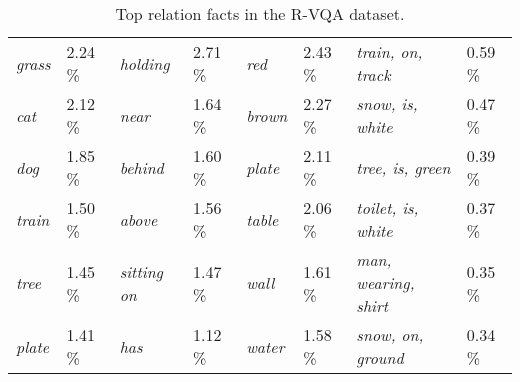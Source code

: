 \documentclass[sigconf]{acmart}
\begin{document}
\begin{table}[t]
\begin{tabular}{*8{l}}
		\textit{grass} \hspace{-2mm}   &   2.24 \%  
		& \textit{holding} \hspace{-2mm}   &   2.71 \%  
		& \textit{red} \hspace{-2mm}   &   2.43 \%  
		& \textit{train, on, track} \hspace{-2mm}   &   0.59 \% \\
		
		\textit{cat} \hspace{-2mm}   &   2.12 \%  
		& \textit{near} \hspace{-2mm}   &   1.64 \%  
		& \textit{brown} \hspace{-2mm}   &   2.27 \% 
		& \textit{snow, is, white} \hspace{-2mm}   &   0.47 \% \\
		
		\textit{dog} \hspace{-2mm}   &   1.85 \%  
		& \textit{behind} \hspace{-2mm}   &   1.60 \%  
		& \textit{plate} \hspace{-2mm}   &   2.11 \%  
		& \textit{tree, is, green} \hspace{-2mm}   &   0.39 \% \\
		
		\textit{train}\hspace{-2mm}    &   1.50 \%  
		& \textit{above} \hspace{-2mm}   &   1.56 \%  
		& \textit{table} \hspace{-2mm}   &   2.06 \%  
		& \textit{toilet, is, white} \hspace{-2mm}   &   0.37 \% \\
		
		\textit{tree} \hspace{-2mm}   &   1.45 \%  
		& \textit{sitting on} \hspace{-2mm}   &   1.47 \%  
		&  \textit{wall} \hspace{-2mm}   &   1.61 \%  
		&  \textit{man, wearing, shirt} \hspace{-2mm}   &   0.35 \% \\
		
		\textit{plate} \hspace{-2mm}   &   1.41 \%  
		& \textit{has} \hspace{-2mm}   &   1.12 \%  
		& \textit{water} \hspace{-2mm}   &   1.58 \%  
		&  \textit{snow, on, ground} \hspace{-2mm}   &   0.34 \% \\
		\bottomrule		
	\end{tabular}
	\caption{Top relation facts in the R-VQA dataset.}
	\label{tab:rvqa-top}
\end{table}
\end{document}
